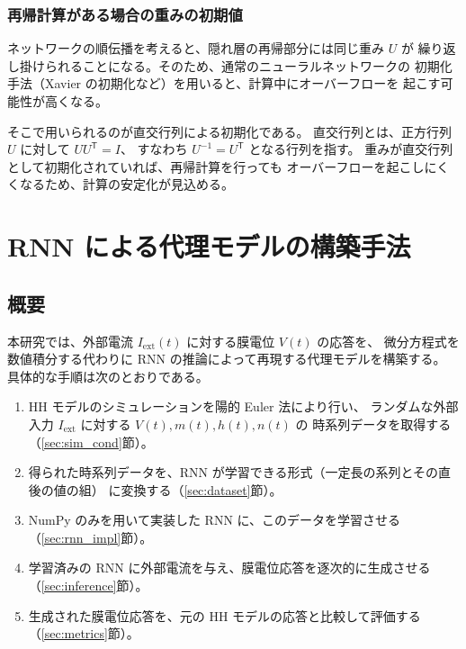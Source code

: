 \documentclass[a4paper,11pt,openany]{ltjsreport}
\newcommand{\Iext}{I_{\mathrm{ext}}}
\begin{document}
\subsection{再帰計算がある場合の重みの初期値}

ネットワークの順伝播を考えると、隠れ層の再帰部分には同じ重み $U$ が
繰り返し掛けられることになる。そのため、通常のニューラルネットワークの
初期化手法（Xavier の初期化など）を用いると、計算中にオーバーフローを
起こす可能性が高くなる。

そこで用いられるのが直交行列による初期化である\cite{saxe2014}。
直交行列とは、正方行列 $U$ に対して $UU^{\mathsf{T}} = I$、
すなわち $U^{-1} = U^{\mathsf{T}}$ となる行列を指す。
重みが直交行列として初期化されていれば、再帰計算を行っても
オーバーフローを起こしにくくなるため、計算の安定化が見込める。

\chapter{RNN による代理モデルの構築手法}

\section{概要}

本研究では、外部電流 $\Iext(t)$ に対する膜電位 $V(t)$ の応答を、
微分方程式を数値積分する代わりに RNN の推論によって再現する代理モデルを構築する。
具体的な手順は次のとおりである。

\begin{enumerate}
  \item HH モデルのシミュレーションを陽的 Euler 法により行い、
        ランダムな外部入力 $\Iext$ に対する $V(t), m(t), h(t), n(t)$ の
        時系列データを取得する（\ref{sec:sim_cond}節）。
  \item 得られた時系列データを、RNN が学習できる形式（一定長の系列とその直後の値の組）
        に変換する（\ref{sec:dataset}節）。
  \item NumPy のみを用いて実装した RNN に、このデータを学習させる（\ref{sec:rnn_impl}節）。
  \item 学習済みの RNN に外部電流を与え、膜電位応答を逐次的に生成させる
        （\ref{sec:inference}節）。
  \item 生成された膜電位応答を、元の HH モデルの応答と比較して評価する
        （\ref{sec:metrics}節）。
\end{enumerate}
\end{document}
